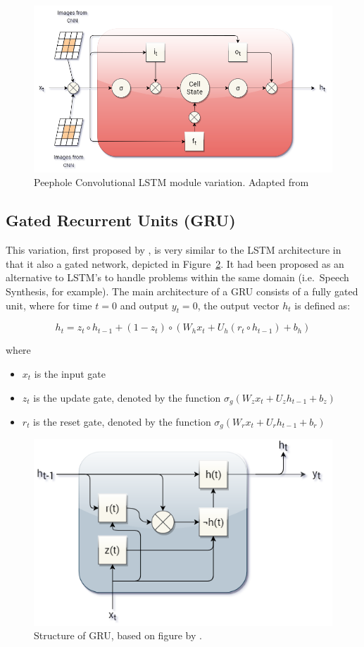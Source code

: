 \begin{figure}
	\centering
	\includegraphics[width=0.6\linewidth]{graphics/lstm/lstm_conv.png}
	\caption{
		Peephole Convolutional LSTM module variation. Adapted from \citet{Gers:2003:LPT:944919.944925}
	}
	\label{fig:lstm_conv}
\end{figure}

\subsection{Gated Recurrent Units (GRU)}
This variation, first proposed by \citet{cho-al-emnlp14}, is very similar to the LSTM architecture in that it also a gated network, depicted in Figure~\ref{fig:gru}. It had been proposed as an alternative to LSTM's to handle problems within the same domain (i.e.\ Speech Synthesis, for example). The main architecture of a GRU consists of a fully gated unit, where for time {$t = 0$} and output {$y_{t} = 0$}, the output vector {$h_{t}$} is defined as:

\begin{equation} \label{GRU transfer function}
	h_{t} = z_{t} \circ h_{t-1} + (1-z_{t}) \circ  (W_{h}x_{t} + U_{h}(r_{t} \circ h_{t-1}) + b_{h})
\end{equation}

where

\begin{itemize}
	\item {$x_{t}$} is the input gate
	\item {$z_{t}$} is the update gate, denoted by the function {$\sigma_{g}(W_{z}x_{t} + U_{z}h_{t-1} + b_{z})$}
	\item {$r_{t}$} is the reset gate, denoted by the function {$\sigma_{g}(W_{r}x_{t} + U_{r}h_{t-1} + b_{r})$}
\end{itemize}

\begin{figure}
\centering
	\includegraphics[width=0.6\linewidth]{graphics/lstm/gru.png}
	\caption{
		Structure of GRU, based on figure by \citet{gruthithuhuong2016}.
	}
	\label{fig:gru}
\end{figure}


